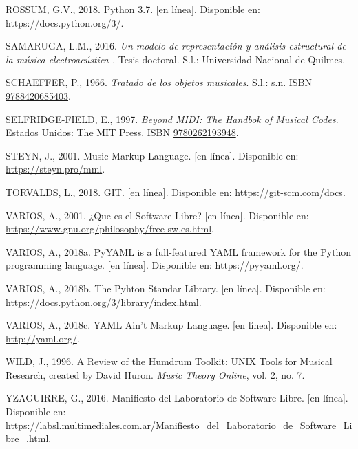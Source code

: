 \documentclass[]{article}
\begin{document}
\leavevmode\hypertarget{ref-python}{}%
ROSSUM, G.V., 2018. Python 3.7. {[}en línea{]}. Disponible en:
\url{https://docs.python.org/3/}.

\leavevmode\hypertarget{ref-samaruga}{}%
SAMARUGA, L.M., 2016. \emph{Un modelo de representación y análisis
estructural de la música electroacústica .} Tesis doctoral. S.l.:
Universidad Nacional de Quilmes.

\leavevmode\hypertarget{ref-schaeffer}{}%
SCHAEFFER, P., 1966. \emph{Tratado de los objetos musicales}. S.l.: s.n.
ISBN \href{https://worldcat.org/isbn/9788420685403}{9788420685403}.

\leavevmode\hypertarget{ref-selfridge}{}%
SELFRIDGE-FIELD, E., 1997. \emph{Beyond MIDI: The Handbok of Musical
Codes}. Estados Unidos: The MIT Press. ISBN
\href{https://worldcat.org/isbn/9780262193948}{9780262193948}.

\leavevmode\hypertarget{ref-mml}{}%
STEYN, J., 2001. Music Markup Language. {[}en línea{]}. Disponible en:
\url{https://steyn.pro/mml}.

\leavevmode\hypertarget{ref-git}{}%
TORVALDS, L., 2018. GIT. {[}en línea{]}. Disponible en:
\url{https://git-scm.com/docs}.

\leavevmode\hypertarget{ref-gnu}{}%
VARIOS, A., 2001. ¿Que es el Software Libre? {[}en línea{]}. Disponible
en: \url{https://www.gnu.org/philosophy/free-sw.es.html}.

\leavevmode\hypertarget{ref-pyyaml}{}%
VARIOS, A., 2018a. PyYAML is a full-featured YAML framework for the
Python programming language. {[}en línea{]}. Disponible en:
\url{https://pyyaml.org/}.

\leavevmode\hypertarget{ref-standarlib}{}%
VARIOS, A., 2018b. The Pyhton Standar Library. {[}en línea{]}.
Disponible en: \url{https://docs.python.org/3/library/index.html}.

\leavevmode\hypertarget{ref-yaml}{}%
VARIOS, A., 2018c. YAML Ain't Markup Language. {[}en línea{]}.
Disponible en: \url{http://yaml.org/}.

\leavevmode\hypertarget{ref-wild}{}%
WILD, J., 1996. A Review of the Humdrum Toolkit: UNIX Tools for Musical
Research, created by David Huron. \emph{Music Theory Online}, vol. 2,
no. 7.

\leavevmode\hypertarget{ref-yzaguirre}{}%
YZAGUIRRE, G., 2016. Manifiesto del Laboratorio de Software Libre. {[}en
línea{]}. Disponible en:
\url{https://labsl.multimediales.com.ar/Manifiesto_del_Laboratorio_de_Software_Libre_.html}.
\end{document}
